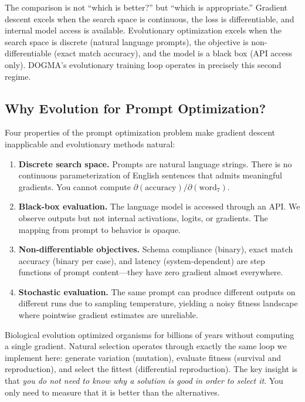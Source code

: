 \begin{remark}
The comparison is not ``which is better?'' but ``which is appropriate.'' Gradient descent excels when the search space is continuous, the loss is differentiable, and internal model access is available. Evolutionary optimization excels when the search space is discrete (natural language prompts), the objective is non-differentiable (exact match accuracy), and the model is a black box (API access only). DOGMA's evolutionary training loop operates in precisely this second regime.
\end{remark}

\subsection{Why Evolution for Prompt Optimization?}

Four properties of the prompt optimization problem make gradient descent inapplicable and evolutionary methods natural:

\begin{enumerate}[leftmargin=1.8em]
  \item \textbf{Discrete search space.} Prompts are natural language strings. There is no continuous parameterization of English sentences that admits meaningful gradients. You cannot compute $\partial (\text{accuracy}) / \partial (\text{word}_7)$.

  \item \textbf{Black-box evaluation.} The language model is accessed through an API. We observe outputs but not internal activations, logits, or gradients. The mapping from prompt to behavior is opaque.

  \item \textbf{Non-differentiable objectives.} Schema compliance (binary), exact match accuracy (binary per case), and latency (system-dependent) are step functions of prompt content---they have zero gradient almost everywhere.

  \item \textbf{Stochastic evaluation.} The same prompt can produce different outputs on different runs due to sampling temperature, yielding a noisy fitness landscape where pointwise gradient estimates are unreliable.
\end{enumerate}

\begin{bioinsight}
Biological evolution optimized organisms for billions of years without computing a single gradient. Natural selection operates through exactly the same loop we implement here: generate variation (mutation), evaluate fitness (survival and reproduction), and select the fittest (differential reproduction). The key insight is that \emph{you do not need to know why a solution is good in order to select it}. You only need to measure that it is better than the alternatives.
\end{bioinsight}

